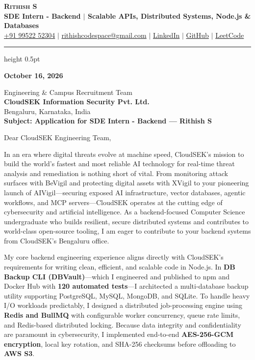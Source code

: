 \documentclass[letterpaper,11pt]{article}
\begin{document}
\begin{center}
    {\textbf{\Huge \scshape Rithish S}} \\ \vspace{2pt}
    {\small \textbf{\color{headingcolor}SDE Intern - Backend $|$ Scalable APIs, Distributed Systems, Node.js \& Databases}} \\ \vspace{2pt}
    \small
    \href{tel:+919952252304}{+91 99522 52304} $|$
    \href{mailto:rithishcodespace@gmail.com}{rithishcodespace@gmail.com} $|$
    \href{https://www.linkedin.com/in/rithish-saravanan-32a39431a/}{LinkedIn} $|$
    \href{https://github.com/rithishcodespace}{GitHub} $|$
    \href{https://leetcode.com/rithishcodespace}{LeetCode}
\end{center}

\vspace{-4pt}
\hrule height 0.5pt \relax
\vspace{8pt}

\textbf{October 16, 2026}

\vspace{2pt}
Engineering \& Campus Recruitment Team \\
\textbf{CloudSEK Information Security Pvt. Ltd.} \\
Bengaluru, Karnataka, India \\

\vspace{2pt}
\textbf{Subject: Application for SDE Intern - Backend — Rithish S}

\vspace{2pt}
Dear CloudSEK Engineering Team,

In an era where digital threats evolve at machine speed, CloudSEK's mission to build the world's fastest and most reliable AI technology for real-time threat analysis and remediation is nothing short of vital. From monitoring attack surfaces with BeVigil and protecting digital assets with XVigil to your pioneering launch of AIVigil---securing exposed AI infrastructure, vector databases, agentic workflows, and MCP servers---CloudSEK operates at the cutting edge of cybersecurity and artificial intelligence. As a backend-focused Computer Science undergraduate who builds resilient, secure distributed systems and contributes to world-class open-source tooling, I am eager to contribute to your backend systems from CloudSEK's Bengaluru office.

My core backend engineering experience aligns directly with CloudSEK's requirements for writing clean, efficient, and scalable code in Node.js. In \textbf{DB Backup CLI (DBVault)}---which I engineered and published to npm and Docker Hub with \textbf{120 automated tests}---I architected a multi-database backup utility supporting PostgreSQL, MySQL, MongoDB, and SQLite. To handle heavy I/O workloads predictably, I designed a distributed job-processing engine using \textbf{Redis and BullMQ} with configurable worker concurrency, queue rate limits, and Redis-based distributed locking. Because data integrity and confidentiality are paramount in cybersecurity, I implemented end-to-end \textbf{AES-256-GCM encryption}, local key rotation, and SHA-256 checksums before offloading to \textbf{AWS S3}.
\end{document}
